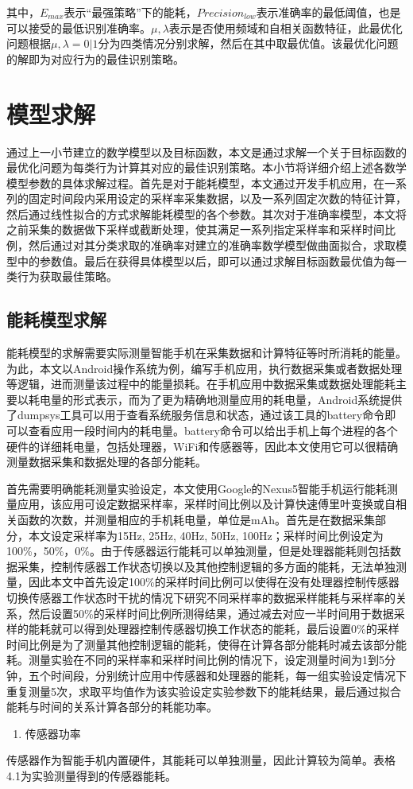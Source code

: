 其中，$E_{max}$表示“最强策略”下的能耗，$Precision_{low}$表示准确率的最低阈值，也是可以接受的最低识别准确率。$\mu, \lambda$表示是否使用频域和自相关函数特征，此最优化问题根据$\mu, \lambda = 0|1$分为四类情况分别求解，然后在其中取最优值。该最优化问题的解即为对应行为的最佳识别策略。
\section{模型求解}
\par 通过上一小节建立的数学模型以及目标函数，本文是通过求解一个关于目标函数的最优化问题为每类行为计算其对应的最佳识别策略。本小节将详细介绍上述各数学模型参数的具体求解过程。首先是对于能耗模型，本文通过开发手机应用，在一系列的固定时间段内采用设定的采样率采集数据，以及一系列固定次数的特征计算，然后通过线性拟合的方式求解能耗模型的各个参数。其次对于准确率模型，本文将之前采集的数据做下采样或截断处理，使其满足一系列指定采样率和采样时间比例，然后通过对其分类求取的准确率对建立的准确率数学模型做曲面拟合，求取模型中的参数值。最后在获得具体模型以后，即可以通过求解目标函数最优值为每一类行为获取最佳策略。
\subsection{能耗模型求解}
\par 能耗模型的求解需要实际测量智能手机在采集数据和计算特征等时所消耗的能量。为此，本文以Android操作系统为例，编写手机应用，执行数据采集或者数据处理等逻辑，进而测量该过程中的能量损耗。在手机应用中数据采集或数据处理能耗主要以耗电量的形式表示，而为了更为精确地测量应用的耗电量，Android系统提供了dumpsys工具可以用于查看系统服务信息和状态，通过该工具的battery命令即可以查看应用一段时间内的耗电量。battery命令可以给出手机上每个进程的各个硬件的详细耗电量，包括处理器，WiFi和传感器等，因此本文使用它可以很精确测量数据采集和数据处理的各部分能耗。
\par 首先需要明确能耗测量实验设定，本文使用Google的Nexus5智能手机运行能耗测量应用，该应用可设定数据采样率，采样时间比例以及计算快速傅里叶变换或自相关函数的次数，并测量相应的手机耗电量，单位是mAh。首先是在数据采集部分，本文设定采样率为15Hz, 25Hz, 40Hz, 50Hz, 100Hz；采样时间比例设定为100\%，50\%，0\%。由于传感器运行能耗可以单独测量，但是处理器能耗则包括数据采集，控制传感器工作状态切换以及其他控制逻辑的多方面的能耗，无法单独测量，因此本文中首先设定100\%的采样时间比例可以使得在没有处理器控制传感器切换传感器工作状态时干扰的情况下研究不同采样率的数据采样能耗与采样率的关系，然后设置50\%的采样时间比例所测得结果，通过减去对应一半时间用于数据采样的能耗就可以得到处理器控制传感器切换工作状态的能耗，最后设置0\%的采样时间比例是为了测量其他控制逻辑的能耗，使得在计算各部分能耗时减去该部分能耗。测量实验在不同的采样率和采样时间比例的情况下，设定测量时间为1到5分钟，五个时间段，分别统计应用中传感器和处理器的能耗，每一组实验设定情况下重复测量5次，求取平均值作为该实验设定实验参数下的能耗结果，最后通过拟合能耗与时间的关系计算各部分的耗能功率。
\begin{enumerate}[(1)]
	\item 传感器功率
\end{enumerate}
\par 传感器作为智能手机内置硬件，其能耗可以单独测量，因此计算较为简单。表格4.1为实验测量得到的传感器能耗。

